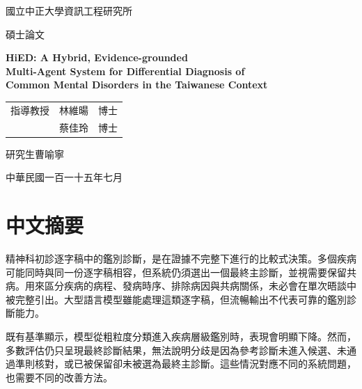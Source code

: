 \documentclass[12pt,a4paper,oneside]{report}
\begin{document}
\begin{titlepage}
\thispagestyle{empty}
\centering

\vspace*{2.0cm}

{\Large 國立中正大學資訊工程研究所\par}
\vspace{0.45cm}
{\Large 碩士論文\par}

\vspace{2.2cm}

{\LARGE\bfseries
HiED: A Hybrid, Evidence-grounded\\[3pt]
Multi-Agent System for Differential Diagnosis of\\[3pt]
Common Mental Disorders in the Taiwanese Context\par}

\vspace{2.6cm}

{\large
\begin{tabular}{@{}r@{\quad}l@{\quad}l@{}}
指導教授 & 林維暘 & 博士\\[0.25cm]
         & 蔡佳玲 & 博士
\end{tabular}\par}

\vspace{0.9cm}

{\large 研究生\quad 曹喻寧\par}

\vfill

{\large 中華民國一百一十五年七月\par}

\vspace*{1.6cm}
\end{titlepage}
\chapter*{中文摘要}
精神科初診逐字稿中的鑑別診斷，是在證據不完整下進行的比較式決策。多個疾病可能同時與同一份逐字稿相容，但系統仍須選出一個最終主診斷，並視需要保留共病。用來區分疾病的病程、發病時序、排除病因與共病關係，未必會在單次晤談中被完整引出。大型語言模型雖能處理這類逐字稿，但流暢輸出不代表可靠的鑑別診斷能力。

既有基準顯示，模型從粗粒度分類進入疾病層級鑑別時，表現會明顯下降。然而，多數評估仍只呈現最終診斷結果，無法說明分歧是因為參考診斷未進入候選、未通過準則核對，或已被保留卻未被選為最終主診斷。這些情況對應不同的系統問題，也需要不同的改善方法。
\end{document}
